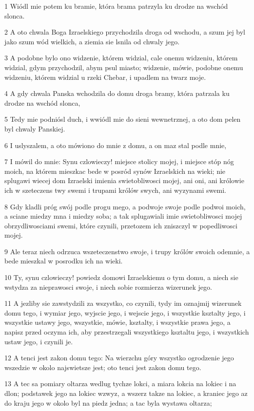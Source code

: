 \par 1 Wiódl mie potem ku bramie, która brama patrzyla ku drodze na wschód slonca.
\par 2 A oto chwala Boga Izraelskiego przychodzila droga od wschodu, a szum jej byl jako szum wód wielkich, a ziemia sie lsnila od chwaly jego.
\par 3 A podobne bylo ono widzenie, którem widzial, cale onemu widzeniu, którem widzial, gdym przychodzil, abym psul miasto; widzenie, mówie, podobne onemu widzeniu, którem widzial u rzeki Chebar, i upadlem na twarz moje.
\par 4 A gdy chwala Panska wchodzila do domu droga bramy, która patrzala ku drodze na wschód slonca,
\par 5 Tedy mie podniósl duch, i wwiódl mie do sieni wewnetrznej, a oto dom pelen byl chwaly Panskiej.
\par 6 I uslyszalem, a oto mówiono do mnie z domu, a on maz stal podle mnie,
\par 7 I mówil do mnie: Synu czlowieczy! miejsce stolicy mojej, i miejsce stóp nóg moich, na którem mieszkac bede w posród synów Izraelskich na wieki; nie splugawi wiecej dom Izraelski imienia swietobliwosci mojej, ani oni, ani królowie ich w szeteczens twy swemi i trupami królów swych, ani wyzynami swemi.
\par 8 Gdy kladli próg swój podle progu mego, a podwoje swoje podle podwoi moich, a sciane miedzy mna i miedzy soba; a tak splugawiali imie swietobliwosci mojej obrzydliwosciami swemi, które czynili, przetozem ich zniszczyl w popedliwosci mojej.
\par 9 Ale teraz niech odrzuca wszeteczenstwo swoje, i trupy królów swoich odemnie, a bede mieszkal w posrodku ich na wieki.
\par 10 Ty, synu czlowieczy! powiedz domowi Izraelskiemu o tym domu, a niech sie wstydza za nieprawosci swoje, i niech sobie rozmierza wizerunek jego.
\par 11 A jezliby sie zawstydzili za wszystko, co czynili, tydy im oznajmij wizerunek domu tego, i wymiar jego, wyjscie jego, i wejscie jego, i wszystkie ksztalty jego, i wszystkie ustawy jego, wszystkie, mówie, ksztalty, i wszystkie prawa jego, a napisz przed oczyma ich, aby przestrzegali wszystkiego ksztaltu jego, i wszystkich ustaw jego, i czynili je.
\par 12 A tenci jest zakon domu tego: Na wierzchu góry wszystko ogrodzenie jego wszedzie w okolo najswietsze jest; oto tenci jest zakon domu tego.
\par 13 A tec sa pomiary oltarza wedlug tychze lokci, a miara lokcia na lokiec i na dlon; podstawek jego na lokiec wzwyz, a wszerz takze na lokiec, a kraniec jego az do kraju jego w okolo byl na piedz jedna; a tac byla wystawa oltarza;
